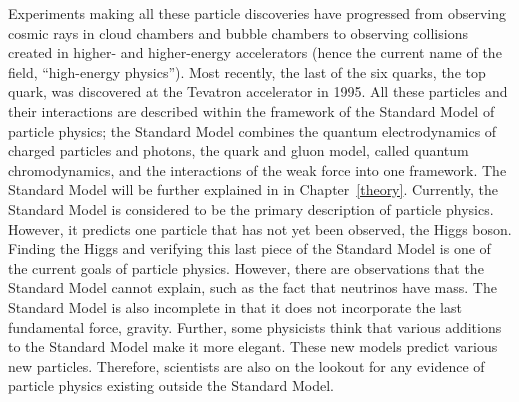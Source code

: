 Experiments making all these particle discoveries 
have progressed from observing cosmic rays 
in cloud chambers and bubble chambers 
to observing collisions created in higher- and higher-energy 
accelerators 
(hence the current name of the field, 
``high-energy physics'').  
Most recently, the last of the six quarks, the top quark, 
was discovered at the Tevatron accelerator in 1995.  
All these particles and their interactions are described 
within the framework of the Standard Model of particle physics; 
the Standard Model combines the quantum electrodynamics 
of charged particles and photons, the quark and gluon model, 
called quantum chromodynamics, 
and the interactions of the weak force into one framework.  
The Standard Model will be further explained in 
in Chapter~\ref{theory}. 
Currently, the Standard Model is considered to be the 
primary description of particle physics.  
However, it predicts one particle that has not yet been 
observed, the Higgs boson.  
Finding the Higgs and verifying this last piece 
of the Standard Model 
is one of the current goals of 
particle physics.  
However, there are observations that 
the Standard Model cannot explain, 
such as the fact that neutrinos have mass.  
The Standard Model is also incomplete in that 
it does not incorporate the last fundamental force, gravity.  
Further, some physicists think that various additions 
to the Standard Model make it more elegant.  
These new models predict various new particles.  
Therefore, scientists are also on the lookout 
for any evidence of particle physics existing 
outside the Standard Model.  




